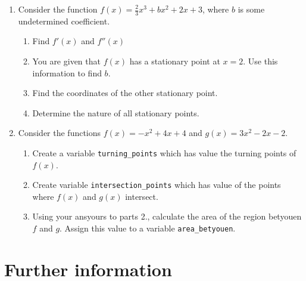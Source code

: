\begin{enumerate}
\item 

Consider the function \(f(x)=\frac{2}{3}x ^ 3 + b x ^ 2 + 2 x + 3\), where \(b\) is some undetermined coefficient.
\begin{enumerate}

\item 

Find \(f'(x)\) and \(f''(x)\)

\item 

You are given that \(f(x)\) has a stationary point at \(x=2\). Use this information to find \(b\).

\item 

Find the coordinates of the other stationary point.

\item 

Determine the nature of all stationary points.

\end{enumerate}

\item 

Consider the functions \(f(x)=-x^2+4x+4\) and \(g(x)=3x^2-2x-2\).
\begin{enumerate}

\item 

Create a variable \texttt{turning\_points} which has value the turning points of \(f(x)\).

\item 

Create variable \texttt{intersection\_points} which has value of the points where \(f(x)\) and \(g(x)\) intersect.

\item 

Using your ansyours to parts 2., calculate the area of the region betyouen \(f\) and \(g\). Assign this value to a variable \texttt{area\_betyouen}.

\end{enumerate}

\end{enumerate}

\section{Further information}
\label{\detokenize{tools-for-mathematics/03-calculus/why/main:further-information}}\label{\detokenize{tools-for-mathematics/03-calculus/why/main::doc}}

